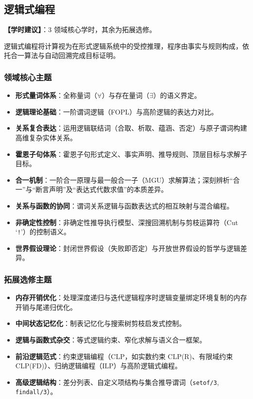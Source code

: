 \subsection{逻辑式编程}
\textbf{【学时建议】}：3 领域核心学时，其余为拓展选修。

逻辑式编程将计算视为在形式逻辑系统中的受控推理，程序由事实与规则构成，依托合一算法与自动回溯完成目标证明。

\subsubsection{领域核心主题}
\begin{itemize}
    \item \textbf{形式量词体系}：全称量词（$\forall$）与存在量词（$\exists$）的语义界定。
    \item \textbf{逻辑理论基础}：一阶谓词逻辑（FOPL）与高阶逻辑的表达力对比。
    \item \textbf{关系复合表达}：运用逻辑联结词（合取、析取、蕴涵、否定）与原子谓词构建高维复杂实体关系。
    \item \textbf{霍恩子句体系}：霍恩子句形式定义、事实声明、推导规则、顶层目标与求解子目标。
    \item \textbf{合一机制}：一阶合一原理与最一般合一子（MGU）求解算法；深刻辨析“合一”与“断言声明”及“表达式代数求值”的本质差异。
    \item \textbf{关系与函数的协同}：谓词关系逻辑与函数表达式的相互映射与混合编程。
    \item \textbf{非确定性控制}：非确定性推导执行模型、深搜回溯机制与剪枝运算符（Cut `\texttt{!}'）的控制语义。
    \item \textbf{世界假设理论}：封闭世界假设（失败即否定）与开放世界假设的哲学与逻辑差异。
\end{itemize}

\subsubsection{拓展选修主题}
\begin{itemize}
    \item \textbf{内存开销优化}：处理深度递归与迭代逻辑程序时逻辑变量绑定环境复制的内存开销与尾递归优化。
    \item \textbf{中间状态记忆化}：制表记忆化与搜索树剪枝启发式控制。
    \item \textbf{逻辑与函数式杂交}：等式逻辑约束、窄化求解与语义合一框架。
    \item \textbf{前沿逻辑范式}：约束逻辑编程（CLP，如实数约束 CLP(R)、有限域约束 CLP(FD)）、归纳逻辑编程（ILP）与高阶逻辑式编程。
    \item \textbf{高级逻辑结构}：差分列表、自定义项结构与集合推导谓词（\texttt{setof/3}, \texttt{findall/3}）。
\end{itemize}

